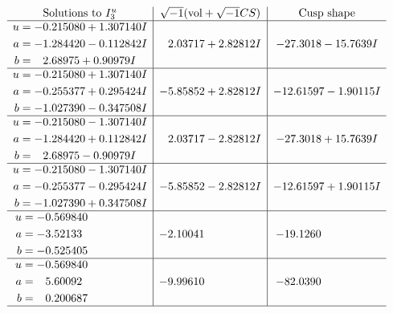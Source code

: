 \documentclass[1p]{elsarticle_modified}
\theoremstyle{definition}
\newcommand{\I}{\sqrt{-1}}
\begin{document}
$$\begin{array}{c|c|c}  
\text{Solutions to }I^u_{3}& \I (\text{vol} + \sqrt{-1}CS) & \text{Cusp shape}\\
 \hline 
\begin{aligned}
u &= -0.215080 + 1.307140 I \\
a &= -1.284420 - 0.112842 I \\
b &= \phantom{-}2.68975 + 0.90979 I\end{aligned}
 & \phantom{-}2.03717 + 2.82812 I & -27.3018 - 15.7639 I \\ \hline\begin{aligned}
u &= -0.215080 + 1.307140 I \\
a &= -0.255377 + 0.295424 I \\
b &= -1.027390 - 0.347508 I\end{aligned}
 & -5.85852 + 2.82812 I & -12.61597 - 1.90115 I \\ \hline\begin{aligned}
u &= -0.215080 - 1.307140 I \\
a &= -1.284420 + 0.112842 I \\
b &= \phantom{-}2.68975 - 0.90979 I\end{aligned}
 & \phantom{-}2.03717 - 2.82812 I & -27.3018 + 15.7639 I \\ \hline\begin{aligned}
u &= -0.215080 - 1.307140 I \\
a &= -0.255377 - 0.295424 I \\
b &= -1.027390 + 0.347508 I\end{aligned}
 & -5.85852 - 2.82812 I & -12.61597 + 1.90115 I \\ \hline\begin{aligned}
u &= -0.569840\phantom{ +0.000000I} \\
a &= -3.52133\phantom{ +0.000000I} \\
b &= -0.525405\phantom{ +0.000000I}\end{aligned}
 & -2.10041\phantom{ +0.000000I} & -19.1260\phantom{ +0.000000I} \\ \hline\begin{aligned}
u &= -0.569840\phantom{ +0.000000I} \\
a &= \phantom{-}5.60092\phantom{ +0.000000I} \\
b &= \phantom{-}0.200687\phantom{ +0.000000I}\end{aligned}
 & -9.99610\phantom{ +0.000000I} & -82.0390\phantom{ +0.000000I}\\
 \hline 
 \end{array}$$\newpage\newpage\renewcommand{\arraystretch}{1}
\end{document}

